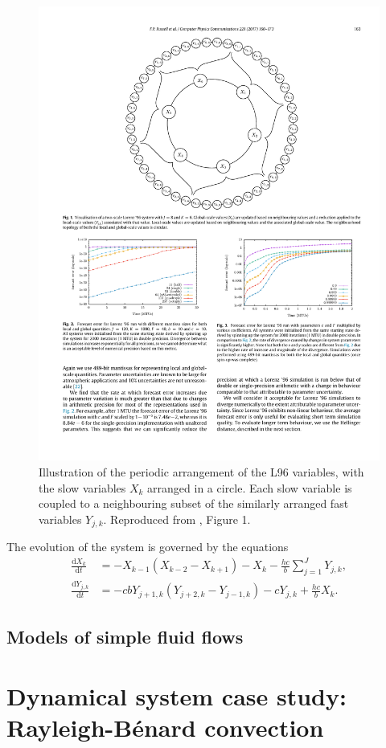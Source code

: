 \documentclass[titlepage,twoside]{article}
\numberwithin{equation}{section}
\newcommand{\diff}[2]{\frac{\mathrm{d} #1}{\mathrm{d} #2}}
\newcommand{\rb}{Rayleigh-B\'{e}nard}
\begin{document}
\begin{figure}[ht]
    \centering
    \includegraphics[width=0.7\linewidth]{figures/russell2017_L96_diagram.pdf}
    \caption{
        Illustration of the periodic arrangement of the L96 variables,
        with the slow variables $X_k$ arranged in a circle. Each slow variable
        is coupled to a neighbouring subset of the similarly arranged fast
        variables $Y_{j,k}$. Reproduced from \textcite{russell2017}, Figure 1.
    }
    \label{fig:L96_diagram}
\end{figure}

The evolution of the system is governed by the equations
\begin{align*}
    \diff{X_k}{t}
        &= -X_{k-1} (X_{k-2} - X_{k+1}) - X_k
        - \frac{hc}{b} \sum_{j=1}^J Y_{j,k}, \\
    \diff{Y_{j,k}}{t}
        &= -cb Y_{j+1,k} (Y_{j+2,k} - Y_{j-1,k}) - c Y_{j,k}
        + \frac{hc}{b} X_k.
\end{align*}


\subsection{Models of simple fluid flows} \label{sec:simple_fluid}


\clearpage
\section{Dynamical system case study: \rb{} convection}
\end{document}
